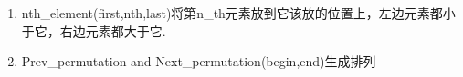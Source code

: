 \begin{enumerate}
\item nth\_element(first,nth,last)将第n\_th元素放到它该放的位置上，左边元素都小于它，右边元素都大于它.
\item Prev\_permutation and Next\_permutation(begin,end)生成排列
\end{enumerate}